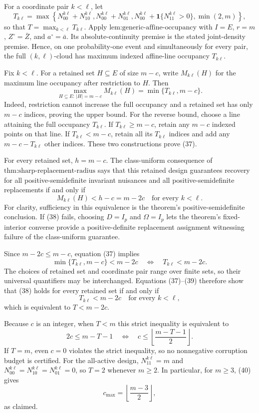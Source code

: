 For a coordinate pair \(k<\ell\), let
\[
 T_{k\ell}
 =\max\!\left\{
 N_{00}^{k\ell}+N_{10}^{k\ell},
 N_{00}^{k\ell}+N_{01}^{k\ell},
 N_{00}^{k\ell}+\mathbf 1\{N_{11}^{k\ell}>0\},
 \min(2,m)
 \right\},
\]
so that \(T=\max_{k<\ell}T_{k\ell}\).  Apply \(\text{lem:generic-affine-occupancy}\) with \(I=E\), \(r=m\), \(Z^\circ=\bar Z\), and \(a^\circ=\bar a\).  Its absolute-continuity premise is the stated joint-density premise.  Hence, on one probability-one event and simultaneously for every pair, the full \((k,\ell)\)-cloud has maximum indexed affine-line occupancy \(T_{k\ell}\).

Fix \(k<\ell\).  For a retained set \(H\subseteq E\) of size \(m-c\), write \(M_{k\ell}(H)\) for the maximum line occupancy after restriction to \(H\).  Then
\[
 \max_{H\subseteq E:\,|H|=m-c}M_{k\ell}(H)
 =\min\{T_{k\ell},m-c\}.
 \tag{37}
\]
Indeed, restriction cannot increase the full occupancy and a retained set has only \(m-c\) indices, proving the upper bound.  For the reverse bound, choose a line attaining the full occupancy \(T_{k\ell}\).  If \(T_{k\ell}\ge m-c\), retain any \(m-c\) indexed points on that line.  If \(T_{k\ell}<m-c\), retain all its \(T_{k\ell}\) indices and add any \(m-c-T_{k\ell}\) other indices.  These two constructions prove (37).

For every retained set, \(h=m-c\).  The class-uniform consequence of \(\text{thm:sharp-replacement-radius}\) says that this retained design guarantees recovery for all positive-semidefinite invariant nuisances and all positive-semidefinite replacements if and only if
\[
 M_{k\ell}(H)<h-c=m-2c
 \quad\text{for every }k<\ell.
 \tag{38}
\]
For clarity, sufficiency in this equivalence is the theorem's positive-semidefinite conclusion.  If (38) fails, choosing \(D=I_p\) and \(\Omega=I_p\) lets the theorem's fixed-interior converse provide a positive-definite replacement assignment witnessing failure of the class-uniform guarantee.

Since \(m-2c\le m-c\), equation (37) implies
\[
 \min\{T_{k\ell},m-c\}<m-2c
 \quad\Longleftrightarrow\quad
 T_{k\ell}<m-2c.
 \tag{39}
\]
The choices of retained set and coordinate pair range over finite sets, so their universal quantifiers may be interchanged.  Equations (37)--(39) therefore show that (38) holds for every retained set if and only if
\[
 T_{k\ell}<m-2c\quad\text{for every }k<\ell,
\]
which is equivalent to \(T<m-2c\).

Because \(c\) is an integer, when \(T<m\) this strict inequality is equivalent to
\[
 2c\le m-T-1
 \quad\Longleftrightarrow\quad
 c\le\left\lfloor\frac{m-T-1}{2}\right\rfloor.
 \tag{40}
\]
If \(T=m\), even \(c=0\) violates the strict inequality, so no nonnegative corruption budget is certified.  For the all-active design, \(N_{11}^{k\ell}=m\) and \(N_{00}^{k\ell}=N_{10}^{k\ell}=N_{01}^{k\ell}=0\), so \(T=2\) whenever \(m\ge2\).  In particular, for \(m\ge3\), (40) gives
\[
 c_{\max}=\left\lfloor\frac{m-3}{2}\right\rfloor,
\]
as claimed.
